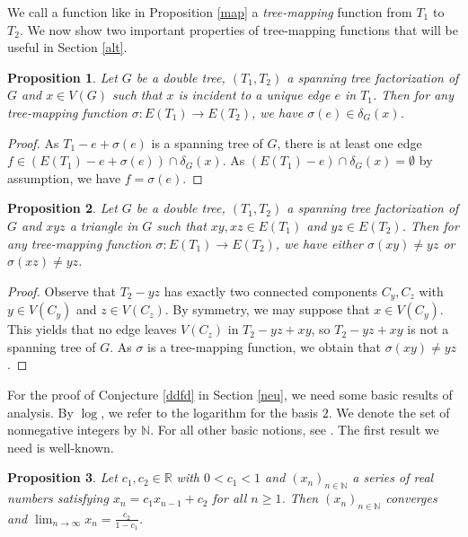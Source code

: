 \documentclass{article}
\theoremstyle{plain}
\newtheorem{Proposition}{Proposition}
\theoremstyle{nonumberplain}
\theoremstyle{nonumberplain}
\newcommand{\stf}{spanning tree factorization }
\begin{document}
We call a function like in Proposition \ref{map} a {\it tree-mapping} function from $T_1$ to $T_2$. We now show two important properties of tree-mapping functions that will be useful in Section \ref{alt}.
\begin{Proposition}\label{trivial2}
Let $G$ be a double tree, $(T_1,T_2)$ a \stf of $G$ and $x \in V(G)$ such that $x$ is incident to a unique edge $e$ in $T_1$. Then for any tree-mapping function $\sigma:E(T_1)\rightarrow E(T_2)$, we have $\sigma(e)\in \delta_G(x)$.
\end{Proposition}
\begin{proof}
As $T_1-e+\sigma(e)$ is a spanning tree of $G$, there is at least one edge $f \in( E(T_1)-e+\sigma(e))\cap \delta_G(x)$. As $(E(T_1)-e)\cap \delta_G(x)= \emptyset$ by assumption, we have $f=\sigma(e)$.
\end{proof}
\begin{Proposition}\label{triangle}
Let $G$ be a double tree, $(T_1,T_2)$ a \stf of $G$ and $xyz$ a triangle in $G$ such that $xy,xz \in E(T_1)$ and $yz \in E(T_2)$. Then for any tree-mapping function $\sigma:E(T_1)\rightarrow E(T_2)$, we have either $\sigma(xy)\neq yz$ or $\sigma(xz)\neq yz$.
\end{Proposition}
\begin{proof}
Observe that $T_2-yz$ has exactly two connected components $C_y,C_z$ with $y \in V(C_y)$ and $z \in V(C_z)$. By symmetry, we may suppose that $x \in V(C_y)$. This yields that no edge leaves $V(C_z)$ in $T_2-yz+xy$, so $T_2-yz+xy$ is not a spanning tree of $G$. As $\sigma$ is a tree-mapping function, we obtain that $\sigma(xy)\neq yz$.
\end{proof}

For the proof of Conjecture \ref{ddfd} in Section \ref{neu}, we need some basic results of analysis. By $\log$, we refer to the logarithm for the basis $2$. We denote the set of nonnegative integers by $\mathbb{N}$. For all other basic notions, see \cite{w}. The first result we need is well-known.
\begin{Proposition}\label{gzigzi}
Let $c_1,c_2 \in \mathbb{R}$ with $0<c_1<1$ and $(x_n)_{n \in \mathbb{N}}$ a series of real numbers satisfying $x_n=c_1x_{n-1}+c_2$ for all $n \geq 1$. Then $(x_n)_{n \in \mathbb{N}}$ converges and $\lim_{n \rightarrow \infty}x_n=\frac {c_2}{1-c_1}$.
\end{Proposition}
\end{document}
